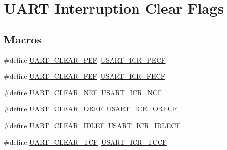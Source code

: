 \hypertarget{group___u_a_r_t___i_t___c_l_e_a_r___flags}{}\section{U\+A\+RT Interruption Clear Flags}
\label{group___u_a_r_t___i_t___c_l_e_a_r___flags}
\subsection*{Macros}
\begin{DoxyCompactItemize}
\item 
\#define \mbox{\hyperlink{group___u_a_r_t___i_t___c_l_e_a_r___flags_ga9c2aef8048dd09ea5e72d69c63026f02}{U\+A\+R\+T\+\_\+\+C\+L\+E\+A\+R\+\_\+\+P\+EF}}~\mbox{\hyperlink{group___peripheral___registers___bits___definition_ga404185136eb68f679e82e0187d66e411}{U\+S\+A\+R\+T\+\_\+\+I\+C\+R\+\_\+\+P\+E\+CF}}
\item 
\#define \mbox{\hyperlink{group___u_a_r_t___i_t___c_l_e_a_r___flags_ga2040edf7a1daa2e9f352364e285ef5c3}{U\+A\+R\+T\+\_\+\+C\+L\+E\+A\+R\+\_\+\+F\+EF}}~\mbox{\hyperlink{group___peripheral___registers___bits___definition_ga8400b4500c41800e5f18fc7291a64c9f}{U\+S\+A\+R\+T\+\_\+\+I\+C\+R\+\_\+\+F\+E\+CF}}
\item 
\#define \mbox{\hyperlink{group___u_a_r_t___i_t___c_l_e_a_r___flags_gad5b9aafb495296d917a5d85e63383396}{U\+A\+R\+T\+\_\+\+C\+L\+E\+A\+R\+\_\+\+N\+EF}}~\mbox{\hyperlink{group___peripheral___registers___bits___definition_gad50b0d2460df1cbddd9576c2f4637312}{U\+S\+A\+R\+T\+\_\+\+I\+C\+R\+\_\+\+N\+CF}}
\item 
\#define \mbox{\hyperlink{group___u_a_r_t___i_t___c_l_e_a_r___flags_ga3bc97b70293f9a7bf8cc21a74094afad}{U\+A\+R\+T\+\_\+\+C\+L\+E\+A\+R\+\_\+\+O\+R\+EF}}~\mbox{\hyperlink{group___peripheral___registers___bits___definition_ga375f76b0670ffeb5d2691592d9e7c422}{U\+S\+A\+R\+T\+\_\+\+I\+C\+R\+\_\+\+O\+R\+E\+CF}}
\item 
\#define \mbox{\hyperlink{group___u_a_r_t___i_t___c_l_e_a_r___flags_ga75ee9be0ac2236931ef3d9514e7dedf4}{U\+A\+R\+T\+\_\+\+C\+L\+E\+A\+R\+\_\+\+I\+D\+L\+EF}}~\mbox{\hyperlink{group___peripheral___registers___bits___definition_ga9d4d7675c0d36ce4347c3509d27c0760}{U\+S\+A\+R\+T\+\_\+\+I\+C\+R\+\_\+\+I\+D\+L\+E\+CF}}
\item 
\#define \mbox{\hyperlink{group___u_a_r_t___i_t___c_l_e_a_r___flags_gadfbfe4df408d1d09ff2adc1ddad3de09}{U\+A\+R\+T\+\_\+\+C\+L\+E\+A\+R\+\_\+\+T\+CF}}~\mbox{\hyperlink{group___peripheral___registers___bits___definition_gacf92ea54425a962dde662b10b61d0250}{U\+S\+A\+R\+T\+\_\+\+I\+C\+R\+\_\+\+T\+C\+CF}}

\end{DoxyCompactItemize}
